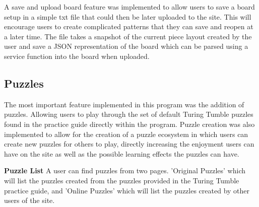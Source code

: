 \documentclass{l4proj}
\begin{document}
A save and upload board feature was implemented to allow users to save a board setup in a simple txt file that could then be later uploaded to the site. This will encourage users to create complicated patterns that they can save and reopen at a later time. The file takes a snapshot of the current piece layout created by the user and save a JSON representation of the board which can be parsed using a service function into the board when uploaded.

\subsection{Puzzles}
The most important feature implemented in this program was the addition of puzzles. Allowing users to play through the set of default Turing Tumble puzzles found in the practice guide directly within the program. Puzzle creation was also implemented to allow for the creation of a puzzle ecosystem in which users can create new puzzles for others to play, directly increasing the enjoyment users can have on the site as well as the possible learning effects the puzzles can have.

\textbf{Puzzle List}
A user can find puzzles from two pages. 'Original Puzzles' which will list the puzzles created from the puzzles provided in the Turing Tumble practice guide, and 'Online Puzzles' which will list the puzzles created by other users of the site.
\end{document}
